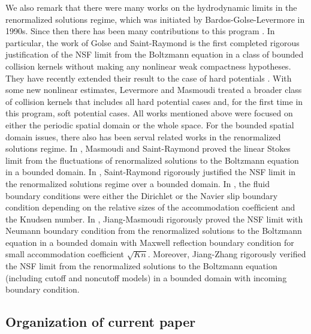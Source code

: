 \documentclass[reqno,11pt]{amsart}
\numberwithin{equation}{section}
\begin{document}
We also remark that there were many works on the hydrodynamic limits in the renormalized solutions regime, which was initiated by Bardos-Golse-Levermore \cite{BGL-JSP-1991,BGL-CPAM-1993} in 1990s. Since then there has been many contributions to this program \cite{BGL-ARMA-2000,GL-CPAM-2002,GSR-IM-2004,GSR-JMPA-2009,JLM-CPDE-2010,LM-ARMA-2010,LM-ARMA-2001-I,LM-ARMA-2001-II,SR-ARMA-2003}. In particular, the work of Golse and Saint-Raymond \cite{GSR-IM-2004} is the ﬁrst completed rigorous justiﬁcation of the NSF limit from the Boltzmann equation in a class of bounded collision kernels without making any nonlinear weak compactness hypotheses. They have recently extended their result to the case of hard potentials \cite{GSR-JMPA-2009}. With some new nonlinear estimates, Levermore and Masmoudi \cite{LM-ARMA-2010} treated a broader class of collision kernels that includes all hard potential cases and, for the ﬁrst time in this program, soft potential cases. All works mentioned above were focused on either the periodic spatial domain or the whole space. For the bounded spatial domain issues, there also has been serval related works in the renormalized solutions regime. In \cite{MSR-CPAM-2003}, Masmoudi and Saint-Raymond proved the linear Stokes limit from the fluctuations of renormalized solutions to the Boltzmann equation in a bounded domain. In \cite{SR-2009-BOOK}, Saint-Raymond rigorously justified the NSF limit in the renormalized solutions regime over a bounded domain. In \cite{MSR-CPAM-2003,SR-2009-BOOK}, the fluid boundary conditions were either the Dirichlet or the Navier slip boundary condition depending on the relative sizes of the accommodation coefﬁcient and the Knudsen number. In \cite{JM-CPAM-2017}, Jiang-Masmoudi rigorously proved the NSF limit with Neumann boundary condition from the renormalized solutions to the Boltzmann equation in a bounded domain with Maxwell reflection boundary condition for small accommodation coefficient $\sqrt{Kn}$. Moreover, Jiang-Zhang \cite{JZ-SIMA-2019,JZ-JDE-2019} rigorously verified the NSF limit from the renormalized solutions to the Boltzmann equation (including cutoff and noncutoff models) in a bounded domain with incoming boundary condition.

\subsection{Organization of current paper}
\end{document}
